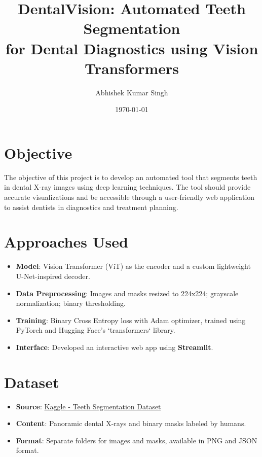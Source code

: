 \documentclass[12pt]{article}
\title{\Huge \textbf{DentalVision: Automated Teeth Segmentation\\ for Dental Diagnostics using Vision Transformers}}
\author{Abhishek Kumar Singh}
\date{\today}
\begin{document}
\maketitle

\tableofcontents
\newpage

\section{Objective}
The objective of this project is to develop an automated tool that segments teeth in dental X-ray images using deep learning techniques. The tool should provide accurate visualizations and be accessible through a user-friendly web application to assist dentists in diagnostics and treatment planning.

\section{Approaches Used}
\begin{itemize}
  \item \textbf{Model}: Vision Transformer (ViT) as the encoder and a custom lightweight U-Net-inspired decoder.
  \item \textbf{Data Preprocessing}: Images and masks resized to 224x224; grayscale normalization; binary thresholding.
  \item \textbf{Training}: Binary Cross Entropy loss with Adam optimizer, trained using PyTorch and Hugging Face's `transformers` library.
  \item \textbf{Interface}: Developed an interactive web app using \textbf{Streamlit}.
\end{itemize}

\section{Dataset}
\begin{itemize}
  \item \textbf{Source}: \href{https://www.kaggle.com/datasets/humansintheloop/teeth-segmentation-on-dental-x-ray-images}{Kaggle - Teeth Segmentation Dataset}
  \item \textbf{Content}: Panoramic dental X-rays and binary masks labeled by humans.
  \item \textbf{Format}: Separate folders for images and masks, available in PNG and JSON format.
\end{itemize}
\end{document}
